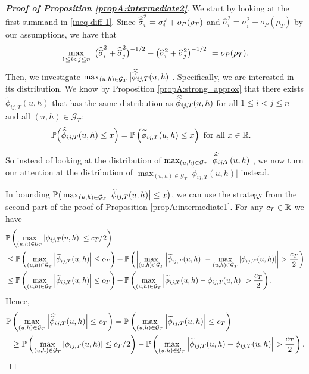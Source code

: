 \begin{proof}[\textnormal{\textbf{Proof of Proposition \ref{propA:intermediate2}}}]
We start by looking at the first summand in \eqref{ineq-diff-1}. Since $\widehat{\widehat{\sigma}}_i^2 = \sigma_i^2 + o_P(\rho_T)$ and $\widehat{\sigma}_i^2 = \sigma_i^2 + o_P(\rho_T)$ by our assumptions, we have that 
\begin{align}\label{ineq-diff-2}
\max_{1 \le i < j \le n} \Big|\big(\widehat{\widehat{\sigma}}_i^2 + \widehat{\widehat{\sigma}}_j^2 \big)^{-1/2} - \big(\widehat{\sigma}_i^2 + \widehat{\sigma}_j^2 \big)^{-1/2}\Big| = o_P(\rho_T).
\end{align}
Then, we investigate $ \max_{(u,h) \in \mathcal{G}_T} \big|\doublehat{\phi}_{ij,T}(u,h)\big|$. Specifically, we are interested in its distribution. We know by Proposition \ref{propA:strong_approx} that there exists $\widetilde{\phi}_{ij, T}(u, h)$ that has the same distribution as $\doublehat{\phi}_{ij,T}(u,h)$ for all $1\le i < j \le n$ and all $(u, h) \in \mathcal{G}_T$:
\begin{align*}
\pr&\Big(\doublehat{\phi}_{ij, T}(u, h) \leq x\Big) = \pr\left(\widetilde{\phi}_{ij, T}(u, h) \leq x\right) \text{ for all } x \in \reals.
\end{align*}

So instead of looking at the distribution of $ \max_{(u,h) \in \mathcal{G}_T} \big|\doublehat{\phi}_{ij,T}(u,h)\big|$, we now turn our attention at the distribution of $ \max_{(u,h) \in \mathcal{G}_T}\big|\widetilde{\phi}_{ij, T}(u, h)\big|$ instead.

In bounding $\mathbb{P}\big( \max_{(u,h) \in \mathcal{G}_T} \big| \widetilde{\phi}_{ij, T}(u, h) \big|\leq x\big)$, we can use the strategy from the second part of the proof of Proposition \ref{propA:intermediate1}. For any $c_T \in \mathbb{R}$ we have
\begin{align*}
&\mathbb{P}\left( \max_{(u,h) \in \mathcal{G}_T}\left|\phi_{ij, T}(u, h)\right| \leq c_T/2\right) \\
&\leq \mathbb{P}\left( \max_{(u,h) \in \mathcal{G}_T}\left|\widetilde{\phi}_{ij, T}(u, h)\right| \leq c_T\right) + \mathbb{P}\left(\left|\max_{(u,h) \in \mathcal{G}_T}\left|\widetilde{\phi}_{ij, T}(u, h)\right| - \max_{(u,h) \in \mathcal{G}_T}\left|\phi_{ij, T}(u, h)\right| \right| > \frac{c_T}{2}\right) \\
&\leq \mathbb{P}\left( \max_{(u,h) \in \mathcal{G}_T}\left|\widetilde{\phi}_{ij, T}(u, h)\right| \leq c_T\right) + \mathbb{P}\left(\max_{(u,h) \in \mathcal{G}_T}\left|\widetilde{\phi}_{ij, T}(u, h)- \phi_{ij, T}(u, h)\right| > \frac{c_T}{2}\right).
\end{align*}
Hence, 
\begin{align}\label{ineq-diff-3}
\begin{split}
\pr&\left(\max_{(u,h) \in \mathcal{G}_T}\Big|\doublehat{\phi}_{ij, T}(u, h)\Big| \leq c_T\right) = \pr\left(\max_{(u,h) \in \mathcal{G}_T}\left|\widetilde{\phi}_{ij, T}(u, h)\right| \leq c_T\right)\\
&\geq \pr\left( \max_{(u,h) \in \mathcal{G}_T}\left|\phi_{ij, T}(u, h)\right| \leq c_T/2\right) - \pr\left(\max_{(u,h) \in \mathcal{G}_T}\left|\widetilde{\phi}_{ij, T}(u, h)- \phi_{ij, T}(u, h)\right| > \frac{c_T}{2}\right).
\end{split}
\end{align}


\end{proof}
